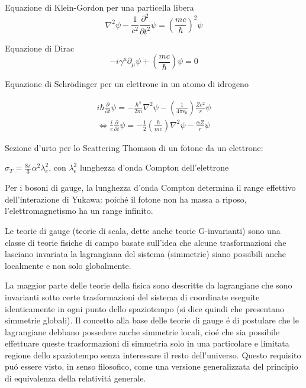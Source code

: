 \documentclass[main.tex]{subfiles}
\begin{document}
\begin{itemize*}
\item Equazione di Klein-Gordon per una particella libera
\begin{equation*}
\nabla^2\psi-\frac{1}{c^2}\frac{\partial^2}{\partial t^2}\psi=(\frac{mc}{\hbar})^2\psi
\end{equation*}
\item  Equazione di Dirac
\begin{equation*}
-i\gamma^{\mu}\partial_{\mu}\psi+(\frac{mc}{\hbar})\psi=0
\end{equation*}
\item  Equazione di Schr\"odinger per un elettrone in un atomo di idrogeno

\begin{align*}
i\hbar\frac{\partial}{\partial t}\psi=-\frac{\hbar^2}{2m}\nabla^2\psi-(\frac{1}{4\pi\epsilon_0})\frac{Ze^2}{r}\psi\\
\Leftrightarrow \frac{i}{c}\frac{\partial}{\partial t}\psi=-\frac{1}{2}(\frac{\hbar}{mc})\nabla^2\psi-\frac{\alpha Z}{r}\psi
\end{align*}

\item Sezione d'urto per lo Scattering Thomson di un fotone da un elettrone:

$\sigma_T=\frac{8\pi}{3}\alpha^2\lambda_e^2$, con $\lambda_e^2$ lunghezza d'onda Compton dell'elettrone

\item Per i bosoni di gauge, la lunghezza d'onda Compton determina il range effettivo dell'interazione di Yukawa: poich\'e il fotone non ha massa a riposo, l'elettromagnetismo ha un range infinito.

Le teorie di gauge (teorie di scala, dette anche teorie G-invarianti) sono una classe di teorie fisiche di campo basate sull'idea che alcune trasformazioni che lasciano invariata la lagrangiana del sistema (simmetrie) siano possibili anche localmente e non solo globalmente.

La maggior parte delle teorie della fisica sono descritte da lagrangiane che sono invarianti sotto certe trasformazioni del sistema di coordinate eseguite identicamente in ogni punto dello spaziotempo (si dice quindi che presentano simmetrie globali). Il concetto alla base delle teorie di gauge \'e di postulare che le lagrangiane debbano possedere anche simmetrie locali, cio\'e che sia possibile effettuare queste trasformazioni di simmetria solo in una particolare e limitata regione dello spaziotempo senza interessare il resto dell'universo. Questo requisito pu\'o essere visto, in senso filosofico, come una versione generalizzata del principio di equivalenza della relativit\'a generale.


\end{itemize*}
\end{document}
